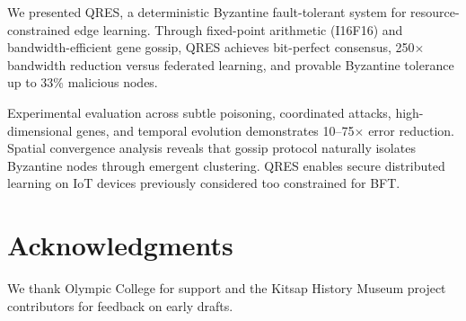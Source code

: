 \documentclass[conference,10pt]{IEEEtran}
\begin{document}
We presented QRES, a deterministic Byzantine fault-tolerant system for resource-constrained edge learning. Through fixed-point arithmetic (I16F16) and bandwidth-efficient gene gossip, QRES achieves bit-perfect consensus, 250$\times$ bandwidth reduction versus federated learning, and provable Byzantine tolerance up to 33\% malicious nodes.

Experimental evaluation across subtle poisoning, coordinated attacks, high-dimensional genes, and temporal evolution demonstrates 10--75$\times$ error reduction. Spatial convergence analysis reveals that gossip protocol naturally isolates Byzantine nodes through emergent clustering. QRES enables secure distributed learning on IoT devices previously considered too constrained for BFT.

\section*{Acknowledgments}
We thank Olympic College for support and the Kitsap History Museum project contributors for feedback on early drafts.
\end{document}
